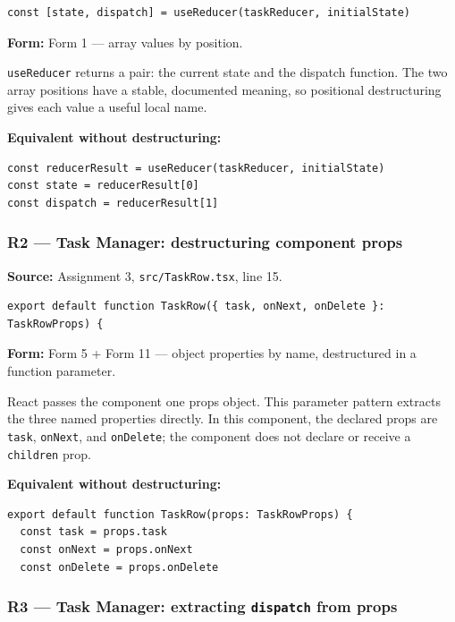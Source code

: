 \documentclass[
]{article}
\newcommand{\passthrough}[1]{#1}
\begin{document}
\begin{lstlisting}
const [state, dispatch] = useReducer(taskReducer, initialState)
\end{lstlisting}

\textbf{Form:} Form 1 --- array values by position.

\passthrough{\lstinline!useReducer!} returns a pair: the current state
and the dispatch function. The two array positions have a stable,
documented meaning, so positional destructuring gives each value a
useful local name.

\textbf{Equivalent without destructuring:}

\begin{lstlisting}
const reducerResult = useReducer(taskReducer, initialState)
const state = reducerResult[0]
const dispatch = reducerResult[1]
\end{lstlisting}

\subsubsection{R2 --- Task Manager: destructuring component
props}\label{r2--task-manager-destructuring-component-props}

\textbf{Source:} Assignment 3,
\passthrough{\lstinline!src/TaskRow.tsx!}, line 15.

\begin{lstlisting}
export default function TaskRow({ task, onNext, onDelete }: TaskRowProps) {
\end{lstlisting}

\textbf{Form:} Form 5 + Form 11 --- object properties by name,
destructured in a function parameter.

React passes the component one props object. This parameter pattern
extracts the three named properties directly. In this component, the
declared props are \passthrough{\lstinline!task!},
\passthrough{\lstinline!onNext!}, and
\passthrough{\lstinline!onDelete!}; the component does not declare or
receive a \passthrough{\lstinline!children!} prop.

\textbf{Equivalent without destructuring:}

\begin{lstlisting}
export default function TaskRow(props: TaskRowProps) {
  const task = props.task
  const onNext = props.onNext
  const onDelete = props.onDelete
\end{lstlisting}

\subsubsection{\texorpdfstring{R3 --- Task Manager: extracting
\texttt{dispatch} from
props}{R3 --- Task Manager: extracting dispatch from props}}\label{r3--task-manager-extracting-dispatch-from-props}
\end{document}
